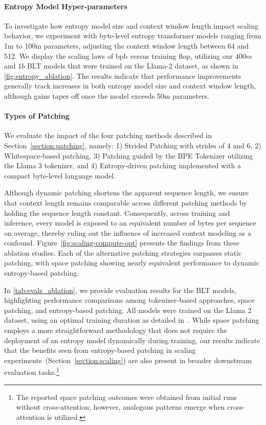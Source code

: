 \paragraph{Entropy Model Hyper-parameters} To investigate how entropy model size and context window length impact scaling behavior, we experiment with byte-level entropy transformer models ranging from 1m to 100m parameters, adjusting the context window length between 64 and 512. We display the scaling laws of bpb versus training flop, utilizing our $400m$ and $1b$ {\textsc BLT} models that were trained on the Llama-2 dataset, as shown in \autoref{fig:entropy_ablation}. The results indicate that performance improvements generally track increases in both entropy model size and context window length, although gains taper off once the model exceeds 50m parameters.

\paragraph{Types of Patching}

We evaluate the impact of the four patching methods described in Section~\ref{section:patching}, namely: 1) Strided Patching with strides of 4 and 6, 2) Whitespace-based patching, 3) Patching guided by the BPE Tokenizer utilizing the Llama 3 tokenizer, and 4) Entropy-driven patching implemented with a compact byte-level language model.

Although dynamic patching shortens the apparent sequence length, we ensure that context length remains comparable across different patching methods by holding the sequence length constant. Consequently, across training and inference, every model is exposed to an equivalent number of bytes per sequence on average, thereby ruling out the influence of increased context modeling as a confound. Figure~\ref{fig:scaling-compute-opt} presents the findings from these ablation studies. Each of the alternative patching strategies surpasses static patching, with space patching showing nearly equivalent performance to dynamic entropy-based patching.

In \autoref{tab:evals_ablation}, we provide evaluation results for the {\textsc BLT} models, highlighting performance comparisons among tokenizer-based approaches, space patching, and entropy-based patching. All models were trained on the Llama 2 dataset, using an optimal training duration as detailed in~\citep{dubey2024llama}. While space patching employs a more straightforward methodology that does not require the deployment of an entropy model dynamically during training, our results indicate that the benefits seen from entropy-based patching in scaling experiments~(Section~\ref{section:scaling}) are also present in broader downstream evaluation tasks.\footnote{The reported space patching outcomes were obtained from initial runs without cross-attention; however, analogous patterns emerge when cross-attention is utilized.}

